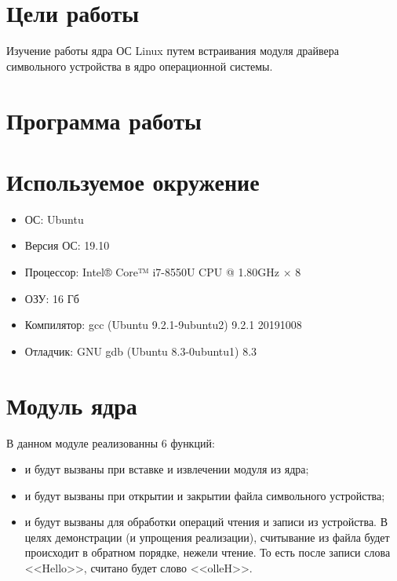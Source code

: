 





\tableofcontents
\newpage

\section{Цели работы}

Изучение работы ядра ОС Linux путем встраивания модуля драйвера символьного устройства в ядро операционной системы.

\section{Программа работы}



\section{Используемое окружение}

\begin{itemize}
	\item ОС: Ubuntu
	\item Версия ОС: 19.10
	\item Процессор: Intel® Core™ i7-8550U CPU @ 1.80GHz × 8
	\item ОЗУ: 16 Гб
	\item Компилятор: gcc (Ubuntu 9.2.1-9ubuntu2) 9.2.1 20191008
	\item Отладчик: GNU gdb (Ubuntu 8.3-0ubuntu1) 8.3
\end{itemize}

\section{Модуль ядра}

В данном модуле реализованны 6 функций:

\begin{itemize}
	\item {} и  будут вызваны при вставке и извлечении модуля из ядра;
	\item {} и  будут вызваны при открытии и закрытии файла символьного устройства;
	\item {} и  будут вызваны для обработки операций чтения и записи из устройства. В целях демонстрации (и упрощения реализации), считывание из файла будет происходит в обратном порядке, нежели чтение. То есть после записи слова <<Hello>>, считано будет слово <<olleH>>.
\end{itemize}

